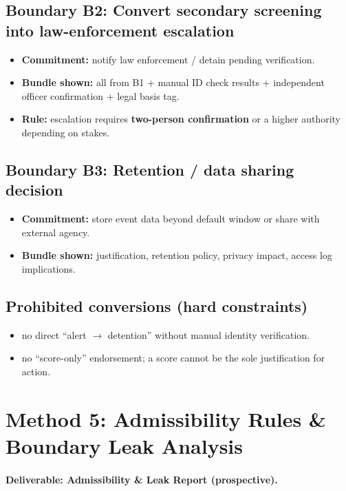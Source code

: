 \subsection*{Boundary B2: Convert secondary screening into law-enforcement escalation}
\begin{itemize}
  \item \textbf{Commitment:} notify law enforcement / detain pending verification.
  \item \textbf{Bundle shown:} all from B1 + manual ID check results + independent officer confirmation + legal basis tag.
  \item \textbf{Rule:} escalation requires \textbf{two-person confirmation} or a higher authority depending on stakes.
\end{itemize}

\subsection*{Boundary B3: Retention / data sharing decision}
\begin{itemize}
  \item \textbf{Commitment:} store event data beyond default window or share with external agency.
  \item \textbf{Bundle shown:} justification, retention policy, privacy impact, access log implications.
\end{itemize}

\subsection*{Prohibited conversions (hard constraints)}
\begin{itemize}
  \item no direct “alert $\rightarrow$ detention” without manual identity verification.
  \item no “score-only” endorsement; a score cannot be the sole justification for action.
\end{itemize}

\section{Method 5: Admissibility Rules \& Boundary Leak Analysis}
\label{sec:airport-m5}

\paragraph{Deliverable: Admissibility \& Leak Report (prospective).}


